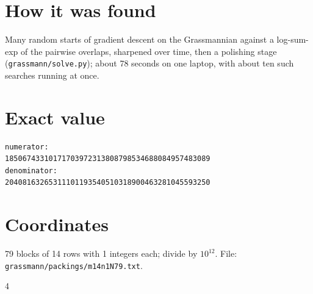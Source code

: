 \documentclass[11pt,a4paper]{article}
\begin{document}
\section{How it was found}
Many random starts of gradient descent on the Grassmannian against a log-sum-exp of the pairwise overlaps, sharpened over time, then a polishing stage (\texttt{grassmann/solve.py}); about 78 seconds on one laptop, with about ten such searches running at once.


\appendix
\section{Exact value}
{\small
\begin{verbatim}
numerator:
18506743310171703972313808798534688084957483089
denominator:
20408163265311101193540510318900463281045593250
\end{verbatim}}

\section{Coordinates}
79 blocks of 14 rows with 1 integers each; divide by $10^{12}$. File: \texttt{grassmann/packings/m14n1N79.txt}.
{\tiny
\begin{multicols}{4}
\end{multicols}}
\end{document}
